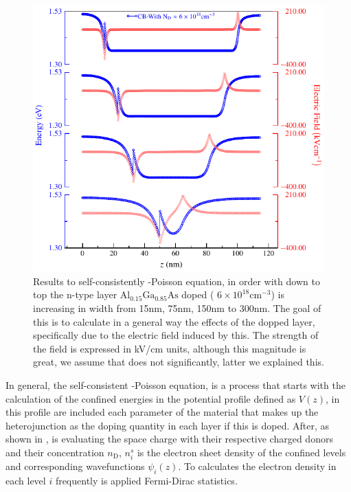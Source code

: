 \begin{figure}[ht!]
	\centering
	\includegraphics[width=\textwidth]{../figures/chapter-3/poisson/build/poisson.pdf}
	\caption{Results to self-consistently \sch-Poisson equation, in order with down to top the n-type layer $\mathrm{Al_{0.15}Ga_{0.85}As}$ doped ( $6\times 10^{18} \mathrm{cm}^{-3}$) is increasing in width from 15nm, 75nm, 150nm to 300nm. The goal of this is to calculate in a general way the effects of the dopped layer, specifically due to the electric field induced by this.  The strength of the field is expressed in kV/cm units, although this magnitude is great, we assume that does not significantly, latter we explained this.}
	\label{fig:chapter-3-pr-poisson-1}
\end{figure}
In general, the self-consistent \sch-Poisson equation, is a process that starts with the calculation of the confined energies in the potential profile defined as $V(z)$,  in this profile are included each parameter of the material that makes up the heterojunction as the doping quantity in each layer if this is doped. After, as shown in , is evaluating the space charge with their respective charged donors and their concentration $n_{\mathrm{D}}$,  $n_{i}^{s}$ is the electron sheet density of the confined levels and corresponding wavefunctions $\psi_{i}(z)$. To  calculates the electron density in each level $i$ frequently is applied Fermi-Dirac statistics\cite{cassan2000onthereduction,ando1987calculation,bastard1990wave}. 

